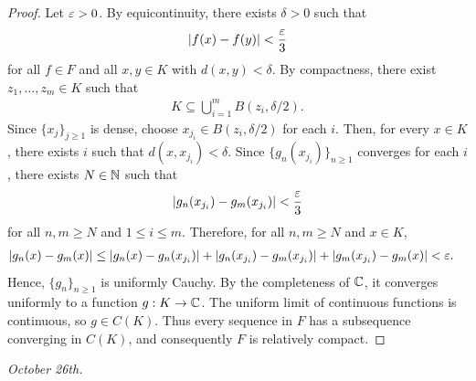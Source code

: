 \begin{proof}
    Let $\varepsilon > 0$. By equicontinuity, there exists $\delta > 0$ such that
    \begin{align}
        \left| f(x)-f(y) \right| < \frac{\varepsilon}{3}
    \end{align}
    for all $f \in F$ and all $x,y \in K$ with $d(x,y) < \delta$. By compactness, there exist $z_{1},\ldots,z_{m} \in K$ such that
    \begin{align}
        K \subseteq \bigcup_{i=1}^{m} B(z_{i},\delta/2).
    \end{align}
    Since $\{x_{j}\}_{j \geq 1}$ is dense, choose $x_{j_{i}} \in B(z_{i},\delta/2)$ for each $i$. Then, for every $x \in K$, there exists $i$ such that $d(x,x_{j_{i}}) < \delta$. Since $\{g_{n}(x_{j_{i}})\}_{n \geq 1}$ converges for each $i$, there exists $N \in \mathbb{N}$ such that
    \begin{align}
        \left| g_{n}(x_{j_{i}})-g_{m}(x_{j_{i}}) \right| < \frac{\varepsilon}{3}
    \end{align}
    for all $n,m \geq N$ and $1 \leq i \leq m$. Therefore, for all $n,m \geq N$ and $x \in K$,
    \begin{align}
        \left| g_{n}(x)-g_{m}(x) \right|
        &\leq \left| g_{n}(x)-g_{n}(x_{j_{i}}) \right|
        +\left| g_{n}(x_{j_{i}})-g_{m}(x_{j_{i}}) \right|
        +\left| g_{m}(x_{j_{i}})-g_{m}(x) \right|
        < \varepsilon.
    \end{align}
    Hence, $\{g_{n}\}_{n \geq 1}$ is uniformly Cauchy. By the completeness of $\mathbb{C}$, it converges uniformly to a function $g:K \to \mathbb{C}$. The uniform limit of continuous functions is continuous, so $g \in C(K)$. Thus every sequence in $F$ has a subsequence converging in $C(K)$, and consequently $F$ is relatively compact.
\end{proof}

\textit{October 26th.}

